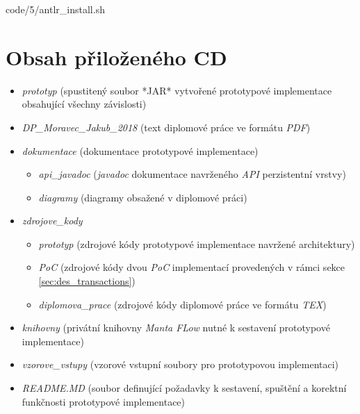 
            {code/5/antlr_install.sh}


\chapter{Obsah přiloženého CD}
\begin{itemize}
   \item{\textit{prototyp}} (spustitený soubor *JAR* vytvořené prototypové implementace obsahující všechny závislosti)
   \item{\textit{DP\_Moravec\_Jakub\_2018}} (text diplomové práce ve formátu \textit{PDF})
   \item{\textit{dokumentace}} (dokumentace prototypové implementace)
      \begin{itemize}
         \item{\textit{api\_javadoc}} (\textit{javadoc} dokumentace navrženého \textit{API} perzistentní vrstvy)
         \item{\textit{diagramy}} (diagramy obsažené v diplomové práci)
      \end{itemize}
   \item{\textit{zdrojove\_kody}}
      \begin{itemize}
         \item{\textit{prototyp}} (zdrojové kódy prototypové implementace navržené architektury)
         \item{\textit{PoC}} (zdrojové kódy dvou \textit{PoC} implementací provedených v rámci sekce \ref{sec:des_transactions})
         \item{\textit{diplomova\_prace}} (zdrojové kódy diplomové práce ve formátu \textit{TEX})
      \end{itemize}
   \item{\textit{knihovny}} (privátní knihovny \textit{Manta FLow} nutné k sestavení prototypové implementace)
   \item{\textit{vzorove\_vstupy}} (vzorové vstupní soubory pro prototypovou implementaci)
   \item{\textit{README.MD}} (soubor definující požadavky k sestavení, spuštění a korektní funkčnosti prototypové implementace)
\end{itemize}

